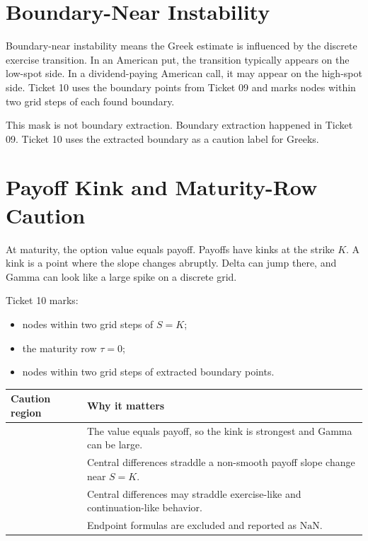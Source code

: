 \documentclass[11pt,a4paper]{article}
\begin{document}
\section{Boundary-Near Instability}

Boundary-near instability means the Greek estimate is influenced by the discrete exercise
transition. In an American put, the transition typically appears on the low-spot side. In a
dividend-paying American call, it may appear on the high-spot side. Ticket 10 uses the boundary
points from Ticket 09 and marks nodes within two grid steps of each found boundary.

This mask is not boundary extraction. Boundary extraction happened in Ticket 09. Ticket 10 uses
the extracted boundary as a caution label for Greeks.

\section{Payoff Kink and Maturity-Row Caution}

At maturity, the option value equals payoff. Payoffs have kinks at the strike \(K\). A kink is a
point where the slope changes abruptly. Delta can jump there, and Gamma can look like a large
spike on a discrete grid.

Ticket 10 marks:
\begin{itemize}
  \item nodes within two grid steps of \(S=K\);
  \item the maturity row \(\tau=0\);
  \item nodes within two grid steps of extracted boundary points.
\end{itemize}

\begin{longtable}{P{0.30\textwidth}L{0.50\textwidth}}
\toprule
Caution region & Why it matters \\
\midrule
\endhead
{} & The value equals payoff, so the kink is strongest and Gamma can be large. \\
 & Central differences straddle a non-smooth payoff slope change near \(S=K\). \\
 & Central differences may straddle exercise-like and continuation-like behavior. \\
 & Endpoint formulas are excluded and reported as \(\mathrm{NaN}\). \\
\bottomrule
\end{longtable}
\end{document}
